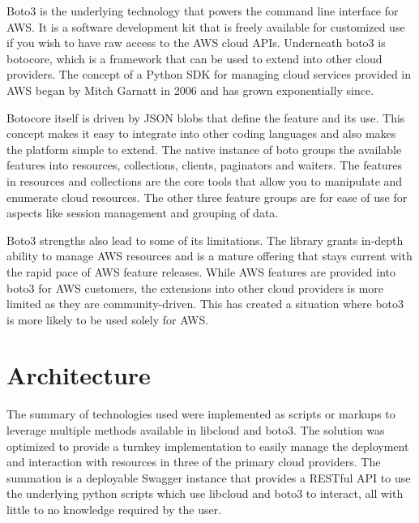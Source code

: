 Boto3 is the underlying technology that powers the command line interface for
AWS. It is a software development kit that is freely available for customized
use if you wish to have raw access to the AWS cloud APIs. Underneath boto3 is
botocore, which is a framework that can be used to extend into other cloud
providers. The concept of a Python SDK for managing cloud services provided in
AWS began by Mitch Garnatt in 2006 and has grown exponentially
since.~\cite{hid-sp18-518-AWS-boto3}

Botocore itself is driven by JSON blobs that define the feature and its use.
This concept makes it easy to integrate into other coding languages and also
makes the platform simple to extend. The native instance of boto groups the
available features into resources, collections, clients, paginators and
waiters.
The features in resources and collections are the core tools that allow you to
manipulate and enumerate cloud resources. The other three feature groups are
for
ease of use for aspects like session management and grouping of
data.~\cite{hid-sp18-518-Boto3}

Boto3 strengths also lead to some of its limitations. The library grants
in-depth ability to manage AWS resources and is a mature offering that stays
current with the rapid pace of AWS feature releases. While AWS features are
provided into boto3 for AWS customers, the extensions into other cloud
providers
is more limited as they are community-driven. This has created a situation
where
boto3 is more likely to be used solely for AWS.

\section{Architecture}

The summary of technologies used were implemented as scripts or markups to
leverage multiple methods available in libcloud and boto3. The solution was
optimized to provide a turnkey implementation to easily manage the deployment
and interaction with resources in three of the primary cloud providers. The
summation is a deployable Swagger instance that provides a RESTful API to use
the underlying python scripts which use libcloud and boto3 to interact, all
with
little to no knowledge required by the user.

